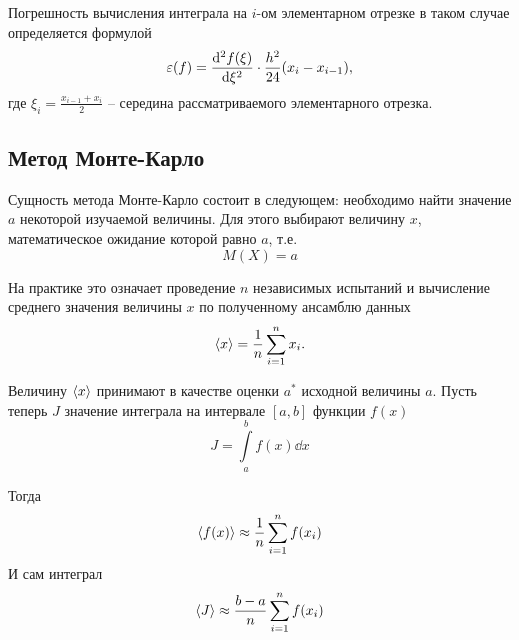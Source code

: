 Погрешность  вычисления интеграла на $i$-ом элементарном отрезке в таком случае определяется формулой
\begin{equation}
    \label{eq:}
    \varepsilon(f) = \dv[2]{f(\xi)}{\xi} \cdot \frac{h^2}{24}(x_i - x_{i-1}),
\end{equation}
где $\xi_i = \frac{x_{i-1} + x_i}{2}$ -- середина рассматриваемого элементарного
отрезка.

\subsection{Метод Монте-Карло}%
\label{sub:metod_monte_karlo}

Сущность метода Монте-Карло состоит в следующем: необходимо найти значение $a$
некоторой изучаемой величины. Для этого выбирают величину  $x$, математическое
ожидание которой равно  $a$, т.е.
 \begin{equation}
    \label{eq:}
    M(X) = a
\end{equation}

На практике это означает проведение $n$ независимых испытаний и вычисление
среднего значения величины $x$ по полученному ансамблю данных
\begin{equation}
    \label{eq:}
    \langle x\rangle = \frac{1}{n} \sum\limits_{i=1}^{n} x_i.
\end{equation}

Величину $\langle x\rangle$ принимают в качестве оценки  $a^*$ исходной величины  $a$.
Пусть теперь $J$ значение интеграла на интервале  $[a,b]$ функции $f(x)$
 \begin{equation}
    \label{eq:}
    J = \int\limits_{a}^{b}  f(x) \dd x
\end{equation}

Тогда
\begin{equation}
    \label{eq:}
    \langle f(x)\rangle \approx \frac{1}{n} \sum\limits_{i=1}^{n} f(x_i)
\end{equation}
И сам интеграл
\begin{equation}
    \label{eq:}
    \langle J\rangle \approx \frac{b-a}{n} \sum\limits_{i=1}^{n} f(x_i)
\end{equation}






